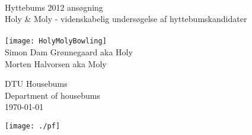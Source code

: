 \begin{titlepage}
\centering \parindent=0pt
 \HRule\\[1cm]\Huge
Hyttebums 2012 ansøgning\\[0.7cm]
\LARGE Holy \& Moly - videnskabelig undersøgelse af hyttebumskandidater\\[1cm]
\HRule\\[2cm]  
\texttt{[image: HolyMolyBowling]}\\ %

\Large Simon Dam Grønnegaard aka Holy\\ 
Morten Halvorsen aka Moly


 \normalsize %
\begin{flushleft} \Large
DTU Housebums\\
Department of housebums\\
\today \end{flushleft}
 \normalsize
\begin{flushright}
\texttt{[image: ./pf]}\\
\end{flushright}
\end{titlepage}